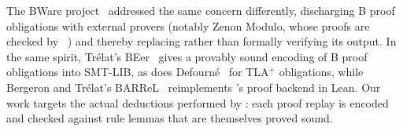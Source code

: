 The BWare project~\cite{bware2014} addressed the same concern differently,
discharging B proof obligations with external provers (notably Zenon Modulo,
whose proofs are checked by \dedukti~\cite{bury2015bset}) and thereby replacing
\pp{} rather than formally verifying its output.
%
In the same spirit, Trélat's BEer~\cite{trelat2025smt} gives a provably
sound encoding of B proof obligations into SMT-LIB, as does
Defourné~\cite{defourne2025scp} for TLA$^+$ obligations, while Bergeron
and Trélat's BARReL~\cite{bergeron2026barrel} reimplements \ab's proof
backend in Lean.
%
Our work targets the actual deductions performed by \pp{}: each proof replay
is encoded and checked against rule lemmas that are themselves proved sound.

